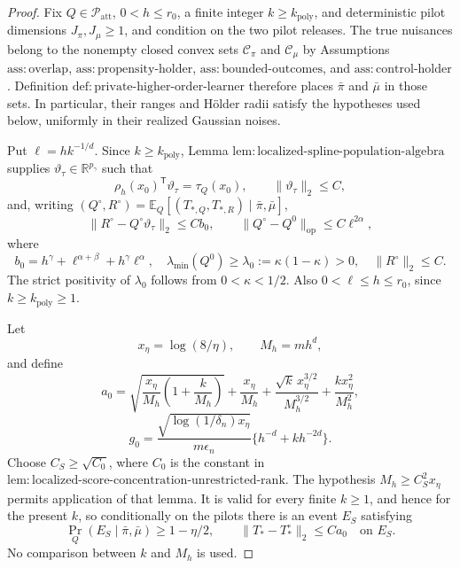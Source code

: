 \documentclass{article}
\begin{document}
\begin{proof}
Fix \(Q\in\mathcal P_{\mathrm{att}}\), \(0<h\le r_0\), a finite integer \(k\ge k_{\mathrm{poly}}\), and deterministic pilot dimensions \(J_\pi,J_\mu\ge1\), and condition on the two pilot releases.  The true nuisances belong to the nonempty closed convex sets \(\mathcal C_\pi\) and \(\mathcal C_\mu\) by Assumptions \(\mathrm{ass{:}overlap}\), \(\mathrm{ass{:}propensity\text{-}holder}\), \(\mathrm{ass{:}bounded\text{-}outcomes}\), and \(\mathrm{ass{:}control\text{-}holder}\).  Definition \(\mathrm{def{:}private\text{-}higher\text{-}order\text{-}learner}\) therefore places \(\bar\pi\) and \(\bar\mu\) in those sets.  In particular, their ranges and H\"older radii satisfy the hypotheses used below, uniformly in their realized Gaussian noises.

Put \(\ell=hk^{-1/d}\).  Since \(k\ge k_{\mathrm{poly}}\), Lemma \(\mathrm{lem{:}localized\text{-}spline\text{-}population\text{-}algebra}\) supplies \(\vartheta_\tau\in\mathbb R^{p_\gamma}\) such that
\[
 \rho_h(x_0)^{\mathsf T}\vartheta_\tau=\tau_Q(x_0),
 \qquad \|\vartheta_\tau\|_2\le C,
\tag{1}
\]
and, writing \((Q^\circ,R^\circ)=\mathbb E_Q[(T_{*,Q},T_{*,R})\mid\bar\pi,\bar\mu]\),
\[
 \|R^\circ-Q^\circ\vartheta_\tau\|_2\le Cb_0,
 \qquad
 \|Q^\circ-Q^0\|_{\mathrm{op}}\le C\ell^{2\alpha},
\tag{2}
\]
where
\[
 b_0=h^\gamma+\ell^{\alpha+\beta}+h^\gamma\ell^\alpha,
 \quad \lambda_{\min}(Q^0)\ge\lambda_0:=\kappa(1-\kappa)>0,
 \quad \|R^\circ\|_2\le C.
\tag{3}
\]
The strict positivity of \(\lambda_0\) follows from \(0<\kappa<1/2\).  Also \(0<\ell\le h\le r_0\), since \(k\ge k_{\mathrm{poly}}\ge1\).

Let
\[
 x_\eta=\log(8/\eta),\qquad M_h=mh^d,
\]
and define
\[
 a_0=
 \sqrt{\frac{x_\eta}{M_h}\left(1+\frac{k}{M_h}\right)}
 +\frac{x_\eta}{M_h}
 +\frac{\sqrt{k}\,x_\eta^{3/2}}{M_h^{3/2}}
 +\frac{kx_\eta^2}{M_h^2},
\tag{4}
\]
\[
 g_0=\frac{\sqrt{\log(1/\delta_n)x_\eta}}{m\epsilon_n}
       \{h^{-d}+kh^{-2d}\}.
\tag{5}
\]
Choose \(C_S\ge\sqrt{C_0}\), where \(C_0\) is the constant in \(\mathrm{lem{:}localized\text{-}score\text{-}concentration\text{-}unrestricted\text{-}rank}\).  The hypothesis \(M_h\ge C_S^2x_\eta\) permits application of that lemma.  It is valid for every finite \(k\ge1\), and hence for the present \(k\), so conditionally on the pilots there is an event \(E_S\) satisfying
\[
 \Pr_Q(E_S\mid\bar\pi,\bar\mu)\ge1-\eta/2,
 \qquad \|T_*-T_*^\circ\|_2\le Ca_0
 \quad\text{on }E_S.
\tag{6}
\]
No comparison between \(k\) and \(M_h\) is used.


\end{proof}
\end{document}
